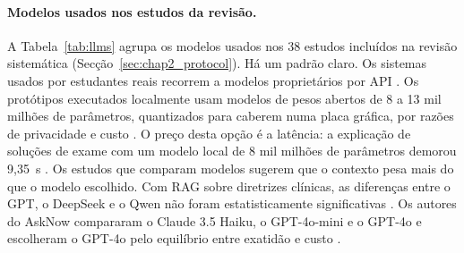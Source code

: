 \paragraph{Modelos usados nos estudos da revisão.} A Tabela~\ref{tab:llms} agrupa os modelos usados nos 38 estudos incluídos na revisão sistemática (Secção~\ref{sec:chap2_protocol}). Há um padrão claro. Os sistemas usados por estudantes reais recorrem a modelos proprietários por \gls{API} \parencite{liu2026asknow,seshadri2026alan,feng2024courseassist,miroyan2025analyzing,buti2026evaluating}. Os protótipos executados localmente usam modelos de pesos abertos de 8 a 13 mil milhões de parâmetros, quantizados para caberem numa placa gráfica, por razões de privacidade e custo \parencite{azam2024cancerbot,khan2025towards,sayeed2026tutor,sbai2025advanced}. O preço desta opção é a latência: a explicação de soluções de exame com um modelo local de 8 mil milhões de parâmetros demorou 9,35~s \parencite{khan2025towards}. Os estudos que comparam modelos sugerem que o contexto pesa mais do que o modelo escolhido. Com \gls{RAG} sobre diretrizes clínicas, as diferenças entre o GPT, o DeepSeek e o Qwen não foram estatisticamente significativas \parencite{raputri2025retrieval}. Os autores do AskNow compararam o Claude 3.5 Haiku, o GPT-4o-mini e o GPT-4o e escolheram o GPT-4o pelo equilíbrio entre exatidão e custo \parencite{liu2026asknow}.

